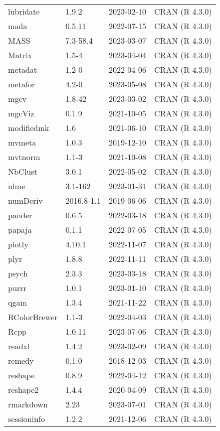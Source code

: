 \documentclass[
]{article}
\begin{document}
\begin{table}
\begin{tabular}[t]{llll}
\addlinespace
lubridate & 1.9.2 & 2023-02-10 & CRAN (R 4.3.0)\\
mada & 0.5.11 & 2022-07-15 & CRAN (R 4.3.0)\\
MASS & 7.3-58.4 & 2023-03-07 & CRAN (R 4.3.0)\\
Matrix & 1.5-4 & 2023-04-04 & CRAN (R 4.3.0)\\
metadat & 1.2-0 & 2022-04-06 & CRAN (R 4.3.0)\\
\addlinespace
metafor & 4.2-0 & 2023-05-08 & CRAN (R 4.3.0)\\
mgcv & 1.8-42 & 2023-03-02 & CRAN (R 4.3.0)\\
mgcViz & 0.1.9 & 2021-10-05 & CRAN (R 4.3.0)\\
modifiedmk & 1.6 & 2021-06-10 & CRAN (R 4.3.0)\\
mvmeta & 1.0.3 & 2019-12-10 & CRAN (R 4.3.0)\\
\addlinespace
mvtnorm & 1.1-3 & 2021-10-08 & CRAN (R 4.3.0)\\
NbClust & 3.0.1 & 2022-05-02 & CRAN (R 4.3.0)\\
nlme & 3.1-162 & 2023-01-31 & CRAN (R 4.3.0)\\
numDeriv & 2016.8-1.1 & 2019-06-06 & CRAN (R 4.3.0)\\
pander & 0.6.5 & 2022-03-18 & CRAN (R 4.3.0)\\
\addlinespace
papaja & 0.1.1 & 2022-07-05 & CRAN (R 4.3.0)\\
plotly & 4.10.1 & 2022-11-07 & CRAN (R 4.3.0)\\
plyr & 1.8.8 & 2022-11-11 & CRAN (R 4.3.0)\\
psych & 2.3.3 & 2023-03-18 & CRAN (R 4.3.0)\\
purrr & 1.0.1 & 2023-01-10 & CRAN (R 4.3.0)\\
\addlinespace
qgam & 1.3.4 & 2021-11-22 & CRAN (R 4.3.0)\\
RColorBrewer & 1.1-3 & 2022-04-03 & CRAN (R 4.3.0)\\
Rcpp & 1.0.11 & 2023-07-06 & CRAN (R 4.3.0)\\
readxl & 1.4.2 & 2023-02-09 & CRAN (R 4.3.0)\\
remedy & 0.1.0 & 2018-12-03 & CRAN (R 4.3.0)\\
\addlinespace
reshape & 0.8.9 & 2022-04-12 & CRAN (R 4.3.0)\\
reshape2 & 1.4.4 & 2020-04-09 & CRAN (R 4.3.0)\\
rmarkdown & 2.23 & 2023-07-01 & CRAN (R 4.3.0)\\
sessioninfo & 1.2.2 & 2021-12-06 & CRAN (R 4.3.0)\\

\end{tabular}
\end{table}
\end{document}

